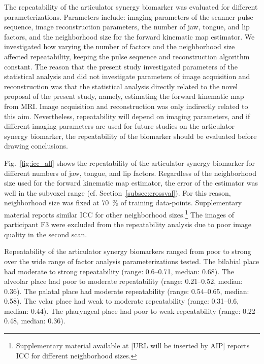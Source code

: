 \documentclass[reprint]{JASAnew}\usepackage[]{graphicx}\usepackage[]{color}
\begin{document}
The repeatability of the articulator synergy biomarker was evaluated for different parameterizations. 
%
Parameters include: imaging parameters of the scanner pulse sequence, image reconstruction parameters, the number of jaw, tongue, and lip factors, and the neighborhood size for the forward kinematic map estimator.
%
We investigated how varying the number of factors and the neighborhood size affected repeatability, keeping the pulse sequence and reconstruction algorithm constant. 
%
The reason that the present study investigated parameters of the statistical analysis and did not investigate parameters of image acquisition and reconstruction was that the statistical analysis directly related to the novel proposal of the present study, namely, estimating the forward kinematic map from MRI. Image acquisition and reconstruction was only indirectly related to this aim. 
%
Nevertheless, repeatability will depend on imaging parameters, and if different imaging parameters are used for future studies on the articulator synergy biomarker, the repeatability of the biomarker should be evaluated before drawing conclusions. 

Fig.~\ref{fig:icc_all} shows the repeatability of the articulator synergy biomarker for different numbers of jaw, tongue, and lip factors. 
%
Regardless of the neighborhood size used for the forward kinematic map estimator, the error of the estimator was well in the subvoxel range (cf. Section~\ref{subsec:crossval}). For this reason, neighborhood size was fixed at \SI{70}{\percent} of training data-points. Supplementary material reports similar ICC for other neighborhood sizes.\footnote{Supplementary material available at [URL will be inserted by AIP] reports ICC for different neighborhood sizes.}
%
The images of participant F3 were excluded from the repeatability analysis due to poor image quality in the second scan. 



Repeatability of the articulator synergy biomarkers ranged from poor to strong over the wide range of factor analysis parameterizations tested. 
%
%
The bilabial place had
moderate  to  strong
repeatability
(range: \numrange{0.6}{0.71},
median: \num{0.68}). 
%
% 
The alveolar place had
poor  to  moderate
repeatability
(range: \numrange{0.21}{0.52},
median: \num{0.36}). 
%
%
The palatal place had
moderate
repeatability
(range: \numrange{0.54}{0.65},
median: \num{0.58}). 
%
%
The velar place had
weak  to  moderate
repeatability
(range: \numrange{0.31}{0.6},
median: \num{0.44}). 
%
%
The pharyngeal place had 
poor  to  weak
repeatability
(range: \numrange{0.22}{0.48},
median: \num{0.36}). 
\end{document}
